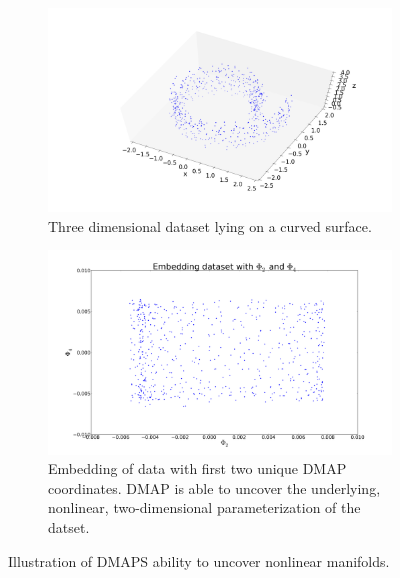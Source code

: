 \documentclass[11pt]{article}
\begin{document}
\begin{figure}[!h]
    \begin{center}
  \begin{subfigure}{1.0\textwidth}
      \includegraphics[width=1.0\textwidth]{dmaps_dataset}
      \caption{Three dimensional dataset lying on a curved surface.}
      \label{fig:swissroll}
  \end{subfigure}
  \begin{subfigure}{1.0\textwidth}
      \includegraphics[width=1.0\textwidth]{dmaps_embedding}
      \caption{Embedding of data with first two unique DMAP coordinates. DMAP is able to uncover the underlying, nonlinear, two-dimensional parameterization of the datset.}
      \label{fig:swissroll:embedding}
  \end{subfigure}
    \end{center}
  \caption{Illustration of DMAPS ability to uncover nonlinear manifolds.}
\end{figure}

\clearpage
\end{document}
